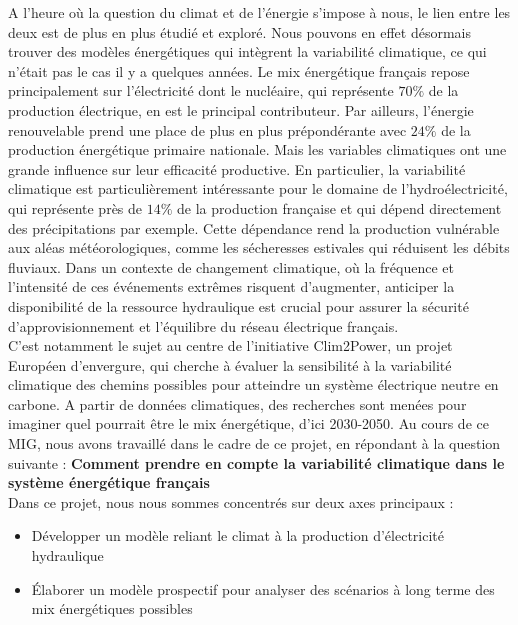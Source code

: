 \documentclass{article}
\theoremstyle{nopointbreak}
\theoremstyle{nobrkbold}
\begin{document}
A l’heure où la question du climat et de l’énergie s'impose à nous, le lien entre les deux est de plus en plus étudié et exploré. Nous pouvons en effet désormais trouver des modèles énergétiques qui intègrent la variabilité climatique, ce qui n’était pas le cas il y a quelques années. Le mix énergétique français repose principalement sur l'électricité dont le nucléaire, qui représente $70 \%$ de la production électrique, en est le principal contributeur. Par ailleurs, l'énergie renouvelable prend une place de plus en plus prépondérante avec $24 \%$ de la production énergétique primaire nationale. Mais les variables climatiques ont une grande influence sur leur efficacité productive. En particulier, la variabilité climatique est particulièrement intéressante pour le domaine de l'hydroélectricité, qui représente près de $14 \%$ de la production française et qui dépend directement des précipitations par exemple. Cette dépendance rend la production vulnérable aux aléas météorologiques, comme les sécheresses estivales qui réduisent les débits fluviaux. Dans un contexte de changement climatique, où la fréquence et l'intensité de ces événements extrêmes risquent d'augmenter, anticiper la disponibilité de la ressource hydraulique est crucial pour assurer la sécurité d'approvisionnement et l'équilibre du réseau électrique français.\\

C'est notamment le sujet au centre de l'initiative Clim2Power, un projet Européen d'envergure, qui cherche à évaluer la sensibilité à la variabilité climatique des chemins possibles pour atteindre un système électrique neutre en carbone. A partir de données climatiques, des recherches sont menées pour imaginer quel pourrait être le mix énergétique, d'ici 2030-2050. Au cours de ce MIG, nous avons travaillé dans le cadre de ce projet, en répondant à la question suivante : \textbf{Comment prendre en compte la variabilité climatique dans le système énergétique français} \\

Dans ce projet, nous nous sommes concentrés sur deux axes principaux :
\begin{itemize}
    \item Développer un modèle reliant le climat à la production d’électricité hydraulique
    \item Élaborer un modèle prospectif pour analyser des scénarios à long terme des mix énergétiques possibles
\end{itemize}
\\
\end{document}
